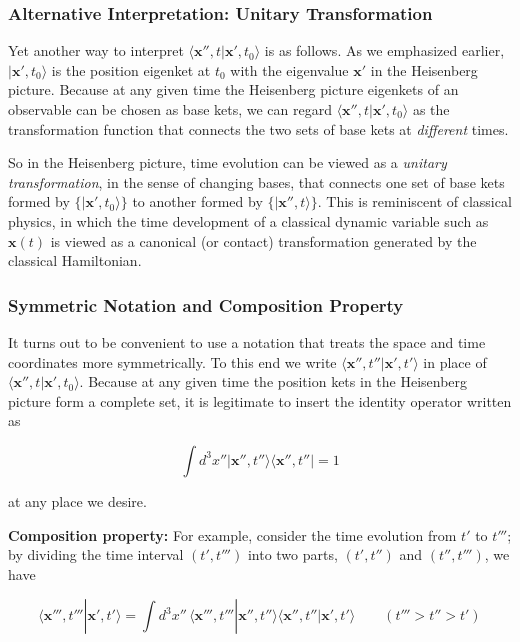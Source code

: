 \documentclass[11pt,a4paper]{article}
\begin{document}
\subsubsection{Alternative Interpretation: Unitary Transformation}

Yet another way to interpret $\langle \mathbf{x}'', t|\mathbf{x}', t_0\rangle$ is as follows. As we emphasized earlier, $|\mathbf{x}', t_0\rangle$ is the position eigenket at $t_0$ with the eigenvalue $\mathbf{x}'$ in the Heisenberg picture. Because at any given time the Heisenberg picture eigenkets of an observable can be chosen as base kets, we can regard $\langle \mathbf{x}'', t|\mathbf{x}', t_0\rangle$ as the transformation function that connects the two sets of base kets at \textit{different} times.

So in the Heisenberg picture, time evolution can be viewed as a \textit{unitary transformation}, in the sense of changing bases, that connects one set of base kets formed by $\{|\mathbf{x}', t_0\rangle\}$ to another formed by $\{|\mathbf{x}'', t\rangle\}$. This is reminiscent of classical physics, in which the time development of a classical dynamic variable such as $\mathbf{x}(t)$ is viewed as a canonical (or contact) transformation generated by the classical Hamiltonian.

\subsubsection{Symmetric Notation and Composition Property}

It turns out to be convenient to use a notation that treats the space and time coordinates more symmetrically. To this end we write $\langle \mathbf{x}'', t''|\mathbf{x}', t'\rangle$ in place of $\langle \mathbf{x}'', t|\mathbf{x}', t_0\rangle$. Because at any given time the position kets in the Heisenberg picture form a complete set, it is legitimate to insert the identity operator written as

\begin{equation}
\int d^3x''|\mathbf{x}'', t''\rangle\langle \mathbf{x}'', t''| = 1
\tag{2.291}
\end{equation}

at any place we desire.

\textbf{Composition property:}
For example, consider the time evolution from $t'$ to $t'''$; by dividing the time interval $(t', t''')$ into two parts, $(t', t'')$ and $(t'', t''')$, we have

\begin{equation}
\boxed{\langle \mathbf{x}''', t'''|\mathbf{x}', t'\rangle = \int d^3x''\,\langle \mathbf{x}''', t'''|\mathbf{x}'', t''\rangle\langle \mathbf{x}'', t''|\mathbf{x}', t'\rangle \qquad (t''' > t'' > t')}
\tag{2.292}
\end{equation}
\end{document}
